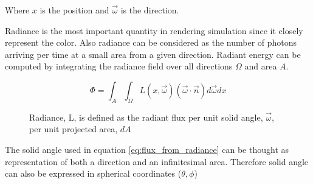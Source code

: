 Where \(x\) is the position and \(\overrightarrow{\omega}\) is the direction. 

Radiance is the most important quantity in rendering simulation since it closely represent the color. Also radiance can be considered as the number of photons arriving per time at a small area from a given direction. Radiant energy can be computed by integrating the radiance field over all directions \(\Omega\) and area \(A\).

\begin{equation} 
\Phi = \int_{A}\int_{\Omega}L(x, \overrightarrow{\omega})(\overrightarrow{\omega} \cdot \overrightarrow{n})d\overrightarrow{\omega}dx
\label{eq:flux_from_radiance}
\end{equation} 

\begin{figure}[htp] 
    \centering 
    \renewcommand{\thefigure}{\thechapter.\arabic{figure}}
    \caption[]{Radiance, L, is defined as the radiant flux per unit solid angle, \(\overrightarrow{\omega}\), per unit projected area, \(dA\)}
    \label{fig:solid_angle_sphere} 
\end{figure}

The solid angle used in equation \ref{eq:flux_from_radiance} can be thought as representation of both a direction and an infinitesimal area. Therefore solid angle can also be expressed in spherical coordinates (\(\theta, \phi\))

